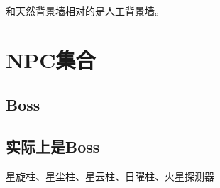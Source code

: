 和天然背景墙相对的是人工背景墙。

\section{NPC集合}
\subsection{Boss}
\subsection{实际上是Boss}\label{app10}
星旋柱、星尘柱、星云柱、日曜柱、火星探测器